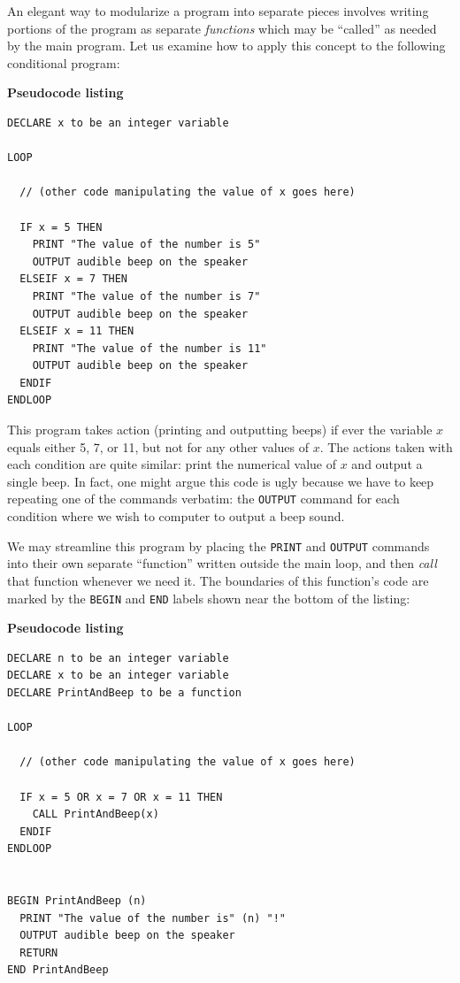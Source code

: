 An elegant way to modularize a program into separate pieces involves writing portions of the program as separate \textit{functions} which may be ``called'' as needed by the main program.  Let us examine how to apply this concept to the following conditional program:

\vskip 10pt

\textbf{Pseudocode listing}

\lstset{language=pseudocode}
\begin{lstlisting}
DECLARE x to be an integer variable

LOOP
 
  // (other code manipulating the value of x goes here)

  IF x = 5 THEN 
    PRINT "The value of the number is 5"
    OUTPUT audible beep on the speaker
  ELSEIF x = 7 THEN
    PRINT "The value of the number is 7"
    OUTPUT audible beep on the speaker
  ELSEIF x = 11 THEN
    PRINT "The value of the number is 11"
    OUTPUT audible beep on the speaker
  ENDIF
ENDLOOP
\end{lstlisting}

\vskip 10pt

This program takes action (printing and outputting beeps) if ever the variable $x$ equals either 5, 7, or 11, but not for any other values of $x$.  The actions taken with each condition are quite similar: print the numerical value of $x$ and output a single beep.  In fact, one might argue this code is ugly because we have to keep repeating one of the commands verbatim: the \texttt{OUTPUT} command for each condition where we wish to computer to output a beep sound.

\filbreak

We may streamline this program by placing the \texttt{PRINT} and \texttt{OUTPUT} commands into their own separate ``function'' written outside the main loop, and then \textit{call} that function whenever we need it.  The boundaries of this function's code are marked by the \texttt{BEGIN} and \texttt{END} labels shown near the bottom of the listing:

\vskip 10pt

\textbf{Pseudocode listing}

\lstset{language=pseudocode}
\begin{lstlisting}
DECLARE n to be an integer variable
DECLARE x to be an integer variable
DECLARE PrintAndBeep to be a function

LOOP
 
  // (other code manipulating the value of x goes here)

  IF x = 5 OR x = 7 OR x = 11 THEN 
    CALL PrintAndBeep(x)
  ENDIF
ENDLOOP


BEGIN PrintAndBeep (n)
  PRINT "The value of the number is" (n) "!"
  OUTPUT audible beep on the speaker
  RETURN
END PrintAndBeep

\end{lstlisting}

